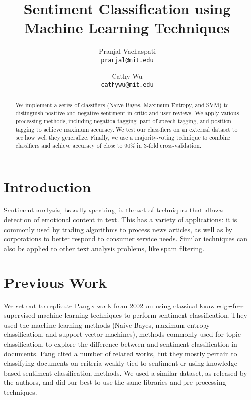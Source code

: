\documentclass[10pt,twocolumn,letterpaper]{article}
\begin{document}
\title{Sentiment Classification using Machine Learning Techniques}

\author{Pranjal Vachaspati\\
{\tt\small pranjal@mit.edu}
\and
Cathy Wu\\
{\tt\small cathywu@mit.edu}
}

\maketitle
\thispagestyle{empty}

\begin{abstract}
We implement a series of classifiers (Naive Bayes, Maximum Entropy, and SVM) to distinguish positive and negative sentiment in critic and user reviews. We apply various processing methods, including negation tagging, part-of-speech tagging, and position tagging to achieve maximum accuracy. We test our classifiers on an external dataset to see how well they generalize. Finally, we use a majority-voting technique to combine classifiers and achieve accuracy of close to 90\% in 3-fold cross-validation.
\end{abstract}

\section{Introduction}

Sentiment analysis, broadly speaking, is the set of techniques that allows detection of emotional content in text. This has a variety of applications: it is commonly used by trading algorithms to process news articles, as well as by corporations to better respond to consumer service needs. Similar techniques can also be applied to other text analysis problems, like spam filtering.

\section{Previous Work}

We set out to replicate Pang’s work from 2002 on using classical knowledge-free supervised machine learning techniques to perform sentiment classification. They used the machine learning methods (Naive Bayes, maximum entropy classification, and support vector machines), methods commonly used for topic classification, to explore the difference between and sentiment classification in documents. Pang cited a number of related works, but they mostly pertain to classifying documents on criteria weakly tied to sentiment or using knowledge-based sentiment classification methods. We used a similar dataset, as released by the authors, and did our best to use the same libraries and pre-processing techniques.
\end{document}
